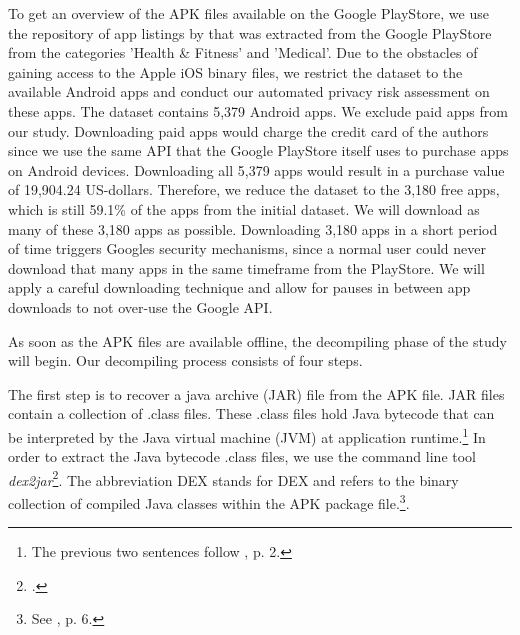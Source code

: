 \documentclass[
	a4paper,
	oneside,
	12pt,
	liststotocnumbered
]{article}
\let\cite\textcite
\begin{document}
To get an overview of the APK files available on the Google PlayStore, we use the repository of app listings by \cite{Xu2015} that was extracted from the Google PlayStore from the categories 'Health \& Fitness' and 'Medical'.
Due to the obstacles of gaining access to the Apple iOS binary files, we restrict the dataset to the available Android apps and conduct our automated privacy risk assessment on these apps.
The \cite{Xu2015} dataset contains 5,379 Android apps. 
We exclude paid apps from our study. Downloading paid apps would charge the credit card of the authors since we use the same \acs{API} that the Google PlayStore itself uses to purchase apps on Android devices. 
Downloading all 5,379 apps would result in a purchase value of 19,904.24 US-dollars. 
Therefore, we reduce the dataset to the 3,180 free apps, which is still 59.1\% of the apps from the initial dataset. 
We will download as many of these 3,180 apps as possible.
Downloading 3,180 apps in a short period of time triggers Googles security mechanisms, since a normal user could never download that many apps in the same timeframe from the PlayStore.
We will apply a careful downloading technique and allow for pauses in between app downloads to not over-use the Google API.

As soon as the \acs{APK} files are available offline, the decompiling phase of the study will begin.
Our decompiling process consists of four steps.

The first step is to recover a java archive (\acs{JAR}) file from the \acs{APK} file.
\acs{JAR} files contain a collection of .class files. 
These .class files hold Java bytecode that can be interpreted by the Java virtual machine (\acs{JVM}) at application runtime.\footnote{The previous two sentences follow \cite{Enck2011}, p. 2.} 
In order to extract the Java bytecode .class files, we use the command line tool \textit{dex2jar}\footnote{\cite{Pan2010}.}. 
The abbreviation \acs{DEX} stands for \acl{DEX} and refers to the binary collection of compiled Java classes within the \acs{APK} package file.\footnote{See \cite{xu2013}, p. 6.}.
\end{document}

